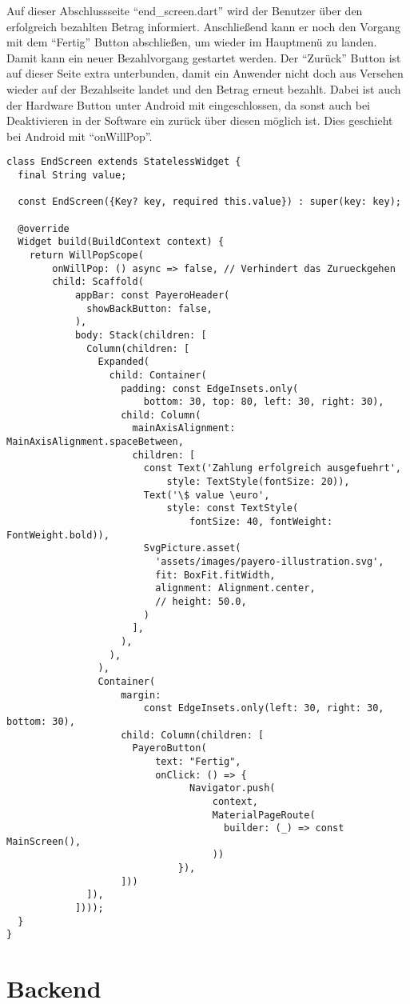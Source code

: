 Auf dieser Abschlussseite ``end\_screen.dart'' wird der Benutzer über den erfolgreich bezahlten Betrag informiert.
Anschließend kann er noch den Vorgang mit dem ``Fertig'' Button abschließen, um wieder im Hauptmenü zu landen.
Damit kann ein neuer Bezahlvorgang gestartet werden.
Der ``Zurück'' Button ist auf dieser Seite extra unterbunden, damit ein Anwender nicht doch aus Versehen wieder auf der Bezahlseite landet und den Betrag erneut bezahlt.
Dabei ist auch der Hardware Button unter Android mit eingeschlossen, da sonst auch bei Deaktivieren in der Software ein zurück über diesen möglich ist.
Dies geschieht bei Android mit ``onWillPop''.

\begin{lstlisting}[caption={EndScreen bei erfolgreichem Bezahlvorgang}]
  class EndScreen extends StatelessWidget {
  final String value;

  const EndScreen({Key? key, required this.value}) : super(key: key);

  @override
  Widget build(BuildContext context) {
    return WillPopScope(
        onWillPop: () async => false, // Verhindert das Zurueckgehen
        child: Scaffold(
            appBar: const PayeroHeader(
              showBackButton: false,
            ),
            body: Stack(children: [
              Column(children: [
                Expanded(
                  child: Container(
                    padding: const EdgeInsets.only(
                        bottom: 30, top: 80, left: 30, right: 30),
                    child: Column(
                      mainAxisAlignment: MainAxisAlignment.spaceBetween,
                      children: [
                        const Text('Zahlung erfolgreich ausgefuehrt',
                            style: TextStyle(fontSize: 20)),
                        Text('\$ value \euro',
                            style: const TextStyle(
                                fontSize: 40, fontWeight: FontWeight.bold)),
                        SvgPicture.asset(
                          'assets/images/payero-illustration.svg',
                          fit: BoxFit.fitWidth,
                          alignment: Alignment.center,
                          // height: 50.0,
                        )
                      ],
                    ),
                  ),
                ),
                Container(
                    margin:
                        const EdgeInsets.only(left: 30, right: 30, bottom: 30),
                    child: Column(children: [
                      PayeroButton(
                          text: "Fertig",
                          onClick: () => {
                                Navigator.push(
                                    context,
                                    MaterialPageRoute(
                                      builder: (_) => const MainScreen(),
                                    ))
                              }),
                    ]))
              ]),
            ])));
  }
}
\end{lstlisting}

\section{Backend}
